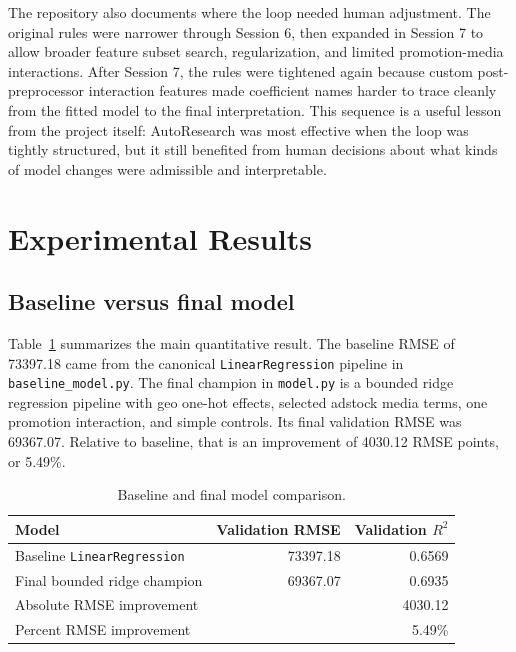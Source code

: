 \documentclass{article}
\begin{document}
The repository also documents where the loop needed human adjustment. The original rules were narrower through Session 6, then expanded in Session 7 to allow broader feature subset search, regularization, and limited promotion-media interactions. After Session 7, the rules were tightened again because custom post-preprocessor interaction features made coefficient names harder to trace cleanly from the fitted model to the final interpretation. This sequence is a useful lesson from the project itself: AutoResearch was most effective when the loop was tightly structured, but it still benefited from human decisions about what kinds of model changes were admissible and interpretable.

\section{Experimental Results}

\subsection{Baseline versus final model}

Table~\ref{tab:baseline-final} summarizes the main quantitative result. The baseline RMSE of 73397.18 came from the canonical \texttt{LinearRegression} pipeline in \texttt{baseline\_model.py}. The final champion in \texttt{model.py} is a bounded ridge regression pipeline with geo one-hot effects, selected adstock media terms, one promotion interaction, and simple controls. Its final validation RMSE was 69367.07. Relative to baseline, that is an improvement of 4030.12 RMSE points, or 5.49\%.

\begin{table}[t]
\centering
\caption{Baseline and final model comparison.}
\label{tab:baseline-final}
\begin{tabular}{lrr}
\toprule
Model & Validation RMSE & Validation $R^2$ \\
\midrule
Baseline \texttt{LinearRegression} & 73397.18 & 0.6569 \\
Final bounded ridge champion & 69367.07 & 0.6935 \\
\midrule
Absolute RMSE improvement & \multicolumn{2}{r}{4030.12} \\
Percent RMSE improvement & \multicolumn{2}{r}{5.49\%} \\
\bottomrule
\end{tabular}
\end{table}
\end{document}
